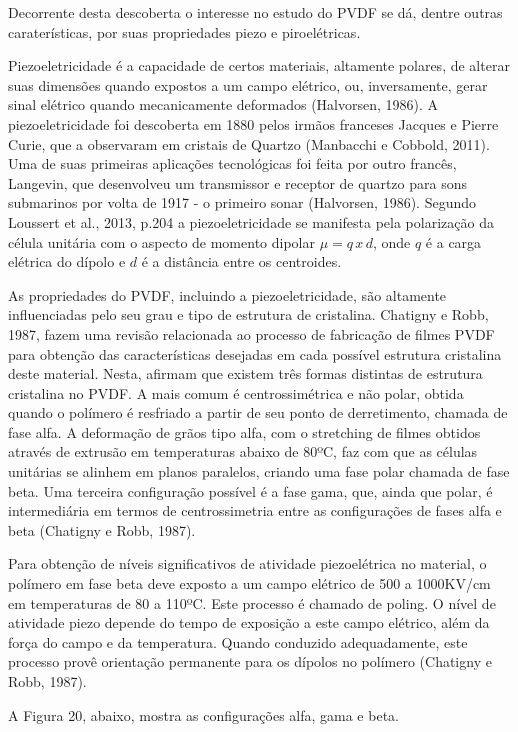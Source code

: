 \documentclass[
	12pt,				
	oneside,			
	a4paper,			
	english,			
	brazil				
	]{abntex2ppgsi}
\begin{document}
Decorrente desta descoberta o interesse no estudo do PVDF se dá, dentre outras caraterísticas, por suas propriedades piezo e piroelétricas. 

Piezoeletricidade é a capacidade de certos materiais, altamente polares, de alterar suas dimensões quando expostos a um campo elétrico, ou, inversamente, gerar sinal elétrico quando mecanicamente deformados (Halvorsen, 1986). A piezoeletricidade foi descoberta em 1880 pelos irmãos franceses Jacques e Pierre Curie, que a observaram em cristais de Quartzo (Manbacchi e Cobbold, 2011). Uma de suas primeiras aplicações tecnológicas foi feita por outro francês, Langevin, que desenvolveu um transmissor e receptor de quartzo para sons submarinos por volta de 1917 - o primeiro sonar (Halvorsen, 1986). Segundo Loussert et al., 2013, p.204 a piezoeletricidade se manifesta pela polarização da célula unitária com o aspecto de momento dipolar $\mu = q \,x \, d$, onde $q$ é a carga elétrica do dípolo e $d$ é a distância entre os centroides.  

As propriedades do PVDF, incluindo a piezoeletricidade, são altamente influenciadas pelo seu grau e tipo de estrutura de cristalina. Chatigny e Robb, 1987, fazem uma revisão relacionada ao processo de fabricação de filmes PVDF para obtenção das características desejadas em cada possível estrutura cristalina deste material. Nesta, afirmam que existem três formas distintas de estrutura cristalina no PVDF. A mais comum é centrossimétrica e não polar, obtida quando o polímero é resfriado a partir de seu ponto de derretimento, chamada de fase alfa. A deformação de grãos tipo alfa, com o stretching de filmes obtidos através de extrusão em temperaturas abaixo de 80ºC, faz com que as células unitárias se alinhem em planos paralelos, criando uma fase polar chamada de fase beta. Uma terceira configuração possível é a fase gama, que, ainda que polar, é intermediária em termos de centrossimetria entre as configurações de fases alfa e beta (Chatigny e Robb, 1987).

Para obtenção de níveis significativos de atividade piezoelétrica no material, o polímero em fase beta deve exposto a um campo elétrico de 500 a 1000KV/cm em temperaturas de 80 a 110ºC. Este processo é chamado de poling. O nível de atividade piezo depende do tempo de exposição a este campo elétrico, além da força do campo e da temperatura. Quando conduzido adequadamente, este processo provê orientação permanente para os dípolos no polímero (Chatigny e Robb, 1987). 

A Figura 20, abaixo, mostra as configurações alfa, gama e beta.
\end{document}
